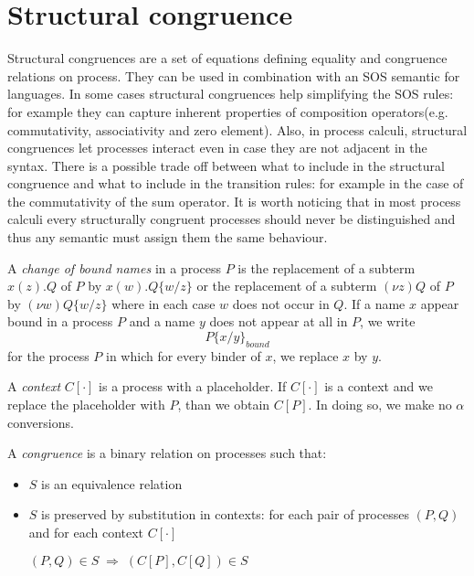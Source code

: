 \section{Structural congruence}

Structural congruences are a set of equations defining equality and congruence relations on process. They can be used in combination with an SOS semantic for languages. In some cases structural congruences help simplifying the SOS rules: for example they can capture inherent properties of composition operators(e.g. commutativity, associativity and zero element). Also, in process calculi, structural congruences let processes interact even in case they are not adjacent in the syntax. There is a possible trade off between what to include in the structural congruence and what to include in the transition rules: for example in the case of the commutativity of the sum operator. It is worth noticing that in most process calculi every structurally congruent processes should never be distinguished and thus any semantic must assign them the same behaviour.


\begin{definition}
  A \emph{change of bound names} in a process $P$ is the replacement of a subterm $x(z).Q$ of $P$ by $x(w).Q\{w/z\}$ or the replacement of a subterm $(\nu z)Q$ of $P$ by $(\nu w)Q\{w/z\}$ where in each case $w$ does not occur in $Q$. If a name $x$ appear bound in a process $P$ and a name $y$ does not appear at all in $P$, we write 
  \[
    P\{x/y\}_{bound}
  \]
  for the process $P$ in which for every binder of $x$, we replace $x$ by $y$.
\end{definition}


\begin{definition}
  A \emph{context} $C[\cdot]$ is a process with a placeholder. If $C[\cdot]$ is a context and we replace the placeholder with $P$, than we obtain $C[P]$. In doing so, we make no $\alpha$ conversions.
\end{definition}


\begin{definition}
  A \emph{congruence} is a binary relation on processes such that:
  \begin{itemize}
    \item 
      $S$ is an equivalence relation
    \item 
      $S$ is preserved by substitution in contexts: for each pair of processes $(P, Q)$ and for each context $C[\cdot]$
      \begin{center}
	$(P,Q)\in S\; \Rightarrow\; (C[P], C[Q])\in S$
      \end{center}
  \end{itemize}
\end{definition}

